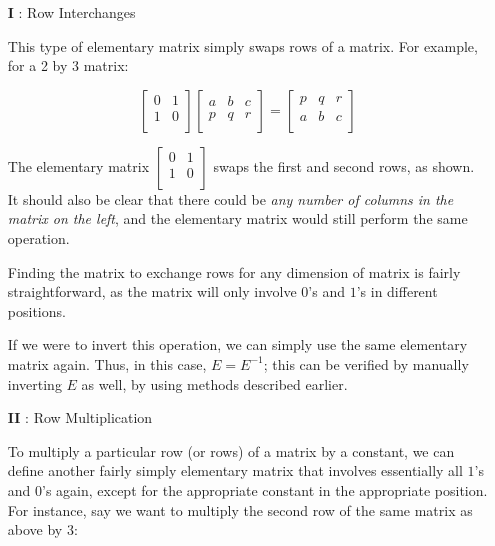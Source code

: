 \documentclass[12pt]{article}
\begin{document}
\begin{itemize}
    \item[\textbf{I}]: Row Interchanges
    
    This type of elementary matrix simply swaps rows of a matrix. For example, for a 2 by 3 matrix:


    \begin{equation}
        \begin{bmatrix}
            0 & 1 \\
            1 & 0\\
        \end{bmatrix} \begin{bmatrix}
            a & b & c\\
            p & q & r\\
        \end{bmatrix} = \begin{bmatrix}
            p & q & r\\
            a & b & c\\
        \end{bmatrix}
    \end{equation}

    The elementary matrix $\begin{bmatrix}
        0 & 1\\
        1 & 0\\
    \end{bmatrix}$ swaps the first and second rows, as shown. It should also be clear that there could be \textit{any number of columns in the matrix on the left}, and the elementary matrix would still perform the same operation.

    Finding the matrix to exchange rows for any dimension of matrix is fairly straightforward, as the matrix will only involve $0$'s and $1$'s in different positions.

    If we were to invert this operation, we can simply use the same elementary matrix again. Thus, in this case, $E = E^{-1}$; this can be verified by manually inverting $E$ as well, by using methods described earlier. 

    \item[\textbf{II}]: Row Multiplication

    To multiply a particular row (or rows) of a matrix by a constant, we can define another fairly simply elementary matrix that involves essentially all $1$'s and $0$'s again, except for the appropriate constant in the appropriate position. For instance, say we want to multiply the second row of the same matrix as above by $3$:


\end{itemize}
\end{document}
